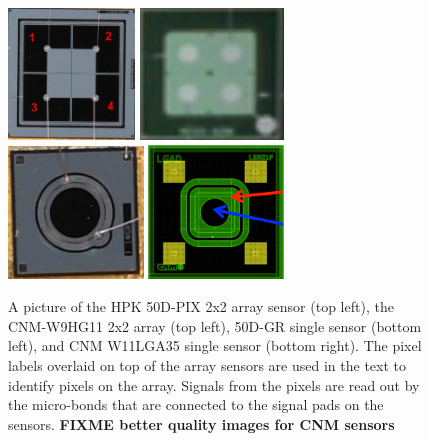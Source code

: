 \documentclass[preprint,1p]{elsarticle}
\begin{document}
\begin{figure}[!htbp] 
\centering
\includegraphics[width=0.3\textwidth]{figs/HPK-50D-PIX.pdf} 
\includegraphics[width=0.34\textwidth]{figs/CNM-W9HG11.pdf} \\
\includegraphics[width=0.32\textwidth]{figs/HPK-50D-GR.pdf} 
\includegraphics[width=0.32\textwidth]{figs/CNM-singlechannel.pdf} 
\caption{A picture of the HPK 50D-PIX 2x2 array sensor (top left), the CNM-W9HG11 2x2 array (top left), 50D-GR single sensor (bottom left), and CNM W11LGA35 single sensor (bottom right). The pixel labels overlaid on top of the array sensors are used in the text to identify pixels on the array. Signals from the pixels are read out by the micro-bonds that are connected to the signal pads on the sensors. \textbf {FIXME better quality images for CNM sensors} } 
\label{fig:HPK_Sensors} 
\end{figure} 
\end{document}
